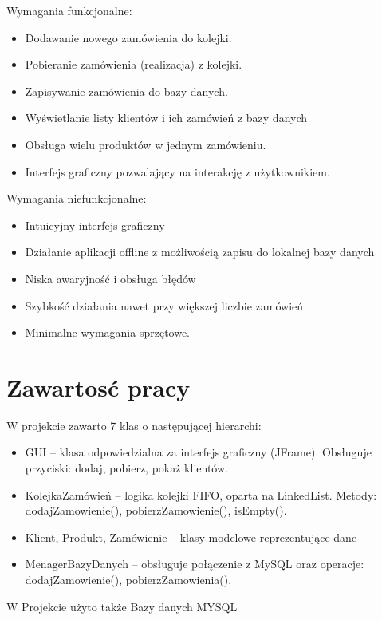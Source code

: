 Wymagania funkcjonalne:
\begin{itemize}
	\item Dodawanie nowego zamówienia do kolejki.
	\item Pobieranie zamówienia (realizacja) z kolejki.
	\item Zapisywanie zamówienia do bazy danych.
	\item Wyświetlanie listy klientów i ich zamówień z bazy danych
	\item Obsługa wielu produktów w jednym zamówieniu.
	\item Interfejs graficzny pozwalający na interakcję z użytkownikiem.
\end{itemize}

Wymagania niefunkcjonalne:
\begin{itemize}
	\item Intuicyjny interfejs graficzny
	\item Działanie aplikacji offline z możliwością zapisu do lokalnej bazy danych
	\item Niska awaryjność i obsługa błędów
	\item Szybkość działania nawet przy większej liczbie zamówień
	\item Minimalne wymagania sprzętowe.
\end{itemize}
\section{Zawartosć pracy}
\label{sec:Zawartosć pracy:}
W projekcie zawarto 7 klas o następującej hierarchi:
\begin{itemize}
	\item GUI – klasa odpowiedzialna za interfejs graficzny (JFrame). Obsługuje przyciski: dodaj, pobierz, pokaż klientów.
	\item KolejkaZamówień – logika kolejki FIFO, oparta na LinkedList. Metody: dodajZamowienie(), pobierzZamowienie(), isEmpty().
	\item Klient, Produkt, Zamówienie – klasy modelowe reprezentujące dane
	\item MenagerBazyDanych – obsługuje połączenie z MySQL oraz operacje: dodajZamowienie(), pobierzZamowienia().
\end{itemize}
W Projekcie użyto także Bazy danych MYSQL
